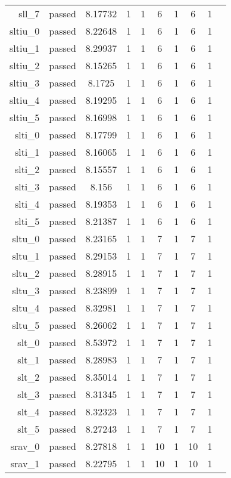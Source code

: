 \begin{longtable}{r|ccccccccc}
    sll\_7 & passed & 8.17732 & 1 & 1 & 6 & 1 & 6 & 1 \\
    sltiu\_0 & passed & 8.22648 & 1 & 1 & 6 & 1 & 6 & 1 \\
    sltiu\_1 & passed & 8.29937 & 1 & 1 & 6 & 1 & 6 & 1 \\
    sltiu\_2 & passed & 8.15265 & 1 & 1 & 6 & 1 & 6 & 1 \\
    sltiu\_3 & passed & 8.1725 & 1 & 1 & 6 & 1 & 6 & 1 \\
    sltiu\_4 & passed & 8.19295 & 1 & 1 & 6 & 1 & 6 & 1 \\
    sltiu\_5 & passed & 8.16998 & 1 & 1 & 6 & 1 & 6 & 1 \\
    slti\_0 & passed & 8.17799 & 1 & 1 & 6 & 1 & 6 & 1 \\
    slti\_1 & passed & 8.16065 & 1 & 1 & 6 & 1 & 6 & 1 \\
    slti\_2 & passed & 8.15557 & 1 & 1 & 6 & 1 & 6 & 1 \\
    slti\_3 & passed & 8.156 & 1 & 1 & 6 & 1 & 6 & 1 \\
    slti\_4 & passed & 8.19353 & 1 & 1 & 6 & 1 & 6 & 1 \\
    slti\_5 & passed & 8.21387 & 1 & 1 & 6 & 1 & 6 & 1 \\
    sltu\_0 & passed & 8.23165 & 1 & 1 & 7 & 1 & 7 & 1 \\
    sltu\_1 & passed & 8.29153 & 1 & 1 & 7 & 1 & 7 & 1 \\
    sltu\_2 & passed & 8.28915 & 1 & 1 & 7 & 1 & 7 & 1 \\
    sltu\_3 & passed & 8.23899 & 1 & 1 & 7 & 1 & 7 & 1 \\
    sltu\_4 & passed & 8.32981 & 1 & 1 & 7 & 1 & 7 & 1 \\
    sltu\_5 & passed & 8.26062 & 1 & 1 & 7 & 1 & 7 & 1 \\
    slt\_0 & passed & 8.53972 & 1 & 1 & 7 & 1 & 7 & 1 \\
    slt\_1 & passed & 8.28983 & 1 & 1 & 7 & 1 & 7 & 1 \\
    slt\_2 & passed & 8.35014 & 1 & 1 & 7 & 1 & 7 & 1 \\
    slt\_3 & passed & 8.31345 & 1 & 1 & 7 & 1 & 7 & 1 \\
    slt\_4 & passed & 8.32323 & 1 & 1 & 7 & 1 & 7 & 1 \\
    slt\_5 & passed & 8.27243 & 1 & 1 & 7 & 1 & 7 & 1 \\
    srav\_0 & passed & 8.27818 & 1 & 1 & 10 & 1 & 10 & 1 \\
    srav\_1 & passed & 8.22795 & 1 & 1 & 10 & 1 & 10 & 1 \\

\end{longtable}
